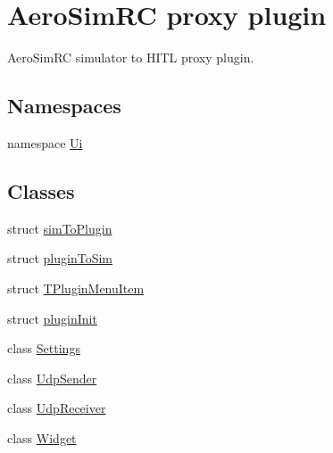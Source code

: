 \hypertarget{group___aero_sim_r_c}{\section{Aero\-Sim\-R\-C proxy plugin}
\label{group___aero_sim_r_c}
}


Aero\-Sim\-R\-C simulator to H\-I\-T\-L proxy plugin.  


\subsection*{Namespaces}
\begin{DoxyCompactItemize}
\item 
namespace \hyperlink{namespace_ui}{Ui}
\end{DoxyCompactItemize}
\subsection*{Classes}
\begin{DoxyCompactItemize}
\item 
struct \hyperlink{structsim_to_plugin}{sim\-To\-Plugin}
\item 
struct \hyperlink{structplugin_to_sim}{plugin\-To\-Sim}
\item 
struct \hyperlink{struct_t_plugin_menu_item}{T\-Plugin\-Menu\-Item}
\item 
struct \hyperlink{structplugin_init}{plugin\-Init}
\item 
class \hyperlink{class_settings}{Settings}
\item 
class \hyperlink{class_udp_sender}{Udp\-Sender}
\item 
class \hyperlink{class_udp_receiver}{Udp\-Receiver}
\item 
class \hyperlink{class_widget}{Widget}
\end{DoxyCompactItemize}
